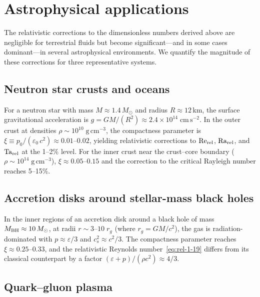 \section{Astrophysical applications}
\label{sec:rel-1-applications}

The relativistic corrections to the dimensionless numbers derived above
are negligible for terrestrial fluids but become significant---and in
some cases dominant---in several astrophysical environments.  We
quantify the magnitude of these corrections for three representative
systems.

\subsection{Neutron star crusts and oceans}

For a neutron star with mass $M\approx 1.4\,M_\odot$ and radius
$R\approx 12$\,km, the surface gravitational acceleration is
$g=GM/(R^{2})\approx 2.4\times 10^{14}\;\mathrm{cm\,s^{-2}}$.
In the outer crust at densities $\rho\sim 10^{10}\;\mathrm{g\,cm^{-3}}$,
the compactness parameter is
$\xi \equiv p_{0}/(\varepsilon_{0}\,c^{2})\approx 0.01$--$0.02$,
yielding relativistic corrections to $\mathrm{Re}_{\rm rel}$,
$\mathrm{Ra}_{\rm rel}$, and $\mathrm{Ta}_{\rm rel}$ at the 1--2\%
level.  For the inner crust near the crust--core boundary
($\rho\sim 10^{14}\;\mathrm{g\,cm^{-3}}$), $\xi\approx 0.05$--$0.15$
and the correction to the critical Rayleigh number reaches 5--15\%.

\subsection{Accretion disks around stellar-mass black holes}

In the inner regions of an accretion disk around a black hole of mass
$M_{\rm BH}\approx 10\,M_\odot$, at radii $r\sim 3$--$10\;r_g$
(where $r_g=GM/c^{2}$), the gas is radiation-dominated with
$p\approx\varepsilon/3$ and $c_{s}^{2}\approx c^{2}/3$.
The compactness parameter reaches $\xi\approx 0.25$--$0.33$, and the
relativistic Reynolds number~\eqref{eq:rel-1-19} differs from its
classical counterpart by a factor
$(\varepsilon+p)/(\rho c^{2})\approx 4/3$.

\subsection{Quark--gluon plasma}

